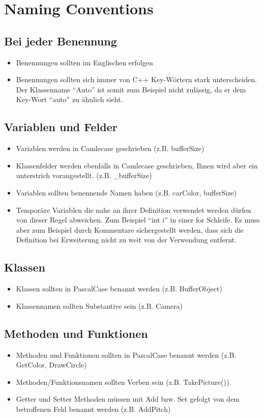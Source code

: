 \section{Naming Conventions}

\subsection{Bei jeder Benennung}
\begin{itemize}[leftmargin=*]
    \item Benennungen sollten im Englischen erfolgen
    \item Benennungen sollten sich immer von C++ Key-Wörtern stark unterscheiden. Der Klassenname “Auto” ist somit zum Beispiel nicht zulässig, da er dem Key-Wort “auto” zu ähnlich sieht.
\end{itemize}

\subsection{Variablen und Felder}
\begin{itemize}[leftmargin=*]
    \item Variablen werden in Camlecase geschrieben (z.B. bufferSize)
    \item Klassenfelder werden ebenfalls in Camlecase geschrieben, Ihnen wird aber ein unterstrich vorangestellt. (z.B. \_bufferSize)
    \item Variablen sollten benennende Namen haben (z.B. carColor, bufferSize)
    \item Temporäre Variablen die nahe an ihrer Definition verwendet werden dürfen von dieser Regel abweichen. Zum Beispiel “int i” in einer for Schleife. Es muss aber zum Beispiel durch Kommentare sichergestellt werden, dass sich die Definition bei Erweiterung nicht zu weit von der Verwendung entfernt.
\end{itemize}

\subsection{Klassen}
\begin{itemize}[leftmargin=*]
    \item Klassen sollten in PascalCase benannt werden (z.B. BufferObject)
    \item Klassennamen sollten Substantive sein (z.B. Camera)
\end{itemize}

\subsection{Methoden und Funktionen}
\begin{itemize}[leftmargin=*]
    \item Methoden und Funktionen sollten in PascalCase benannt werden (z.B. GetColor, DrawCircle)
    \item Methoden/Funktionsnamen sollten Verben sein (z.B. TakePicture()).
    \item Getter und Setter Methoden müssen mit Add bzw. Set gefolgt von dem betroffenen Feld benannt werden (z.B. AddPitch)
\end{itemize}
